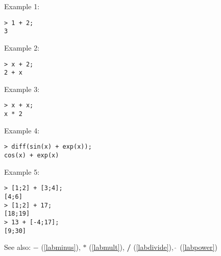 \noindent Example 1: 
\begin{center}\begin{minipage}{15cm}\begin{Verbatim}[frame=single]
> 1 + 2;
3
\end{Verbatim}
\end{minipage}\end{center}
\noindent Example 2: 
\begin{center}\begin{minipage}{15cm}\begin{Verbatim}[frame=single]
> x + 2;
2 + x
\end{Verbatim}
\end{minipage}\end{center}
\noindent Example 3: 
\begin{center}\begin{minipage}{15cm}\begin{Verbatim}[frame=single]
> x + x;
x * 2
\end{Verbatim}
\end{minipage}\end{center}
\noindent Example 4: 
\begin{center}\begin{minipage}{15cm}\begin{Verbatim}[frame=single]
> diff(sin(x) + exp(x));
cos(x) + exp(x)
\end{Verbatim}
\end{minipage}\end{center}
\noindent Example 5: 
\begin{center}\begin{minipage}{15cm}\begin{Verbatim}[frame=single]
> [1;2] + [3;4];
[4;6]
> [1;2] + 17;
[18;19]
> 13 + [-4;17];
[9;30]
\end{Verbatim}
\end{minipage}\end{center}
See also: \textbf{$-$} (\ref{labminus}), \textbf{$*$} (\ref{labmult}), \textbf{/} (\ref{labdivide}), \textbf{$\mathbf{\hat{~}}$} (\ref{labpower})
